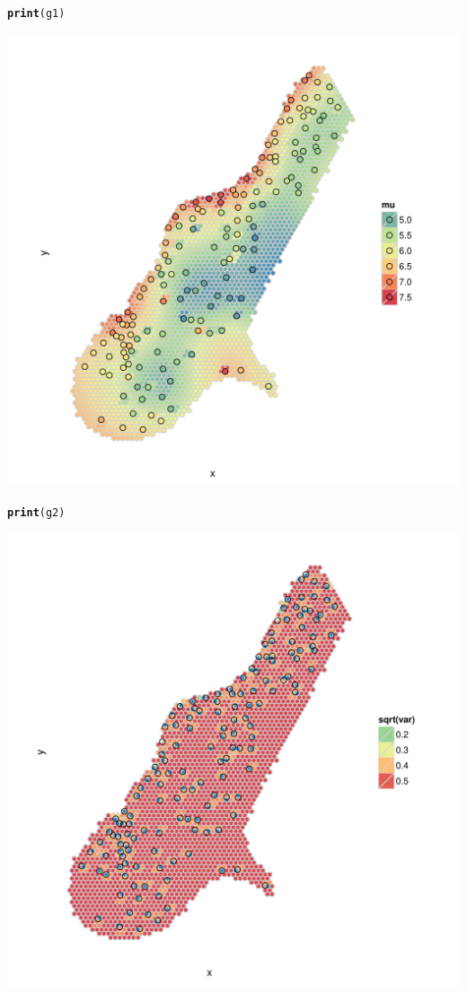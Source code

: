 \documentclass{article}\usepackage[]{graphicx}\usepackage[]{color}
\makeatletter
\def\maxwidth{ %
  \ifdim\Gin@nat@width>\linewidth
    \linewidth
  \else
    \Gin@nat@width
  \fi
}
\newcommand{\hlstd}[1]{\textcolor[rgb]{0.345,0.345,0.345}{#1}}%
\newcommand{\hlkwd}[1]{\textcolor[rgb]{0.737,0.353,0.396}{\textbf{#1}}}%
\newenvironment{kframe}{%
 \def\at@end@of@kframe{}%
 \ifinner\ifhmode%
  \def\at@end@of@kframe{\end{minipage}}%
  \begin{minipage}{\columnwidth}%
 \fi\fi%
 \def\FrameCommand##1{\hskip\@totalleftmargin \hskip-\fboxsep
 \colorbox{shadecolor}{##1}\hskip-\fboxsep
     \hskip-\linewidth \hskip-\@totalleftmargin \hskip\columnwidth}%
 \MakeFramed {\advance\hsize-\width
   \@totalleftmargin\z@ \linewidth\hsize
   \@setminipage}}%
 {\par\unskip\endMakeFramed%
 \at@end@of@kframe}
\newenvironment{knitrout}{}{} %
\makeatother
\begin{document}
\begin{knitrout}
\begin{kframe}
\begin{alltt}
    \hlkwd{print}\hlstd{(g1)}
\end{alltt}
\end{kframe}
\includegraphics[width=\maxwidth]{figure/unnamed-chunk-1-2} 
\begin{kframe}\begin{alltt}
    \hlkwd{print}\hlstd{(g2)}
\end{alltt}
\end{kframe}
\includegraphics[width=\maxwidth]{figure/unnamed-chunk-1-3} 

\end{knitrout}
\end{document}
